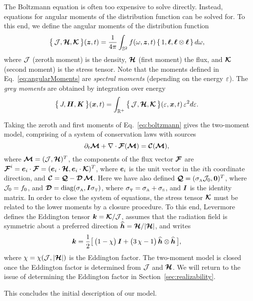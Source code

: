 The Boltzmann equation is often too expensive to solve directly.  
Instead, equations for angular moments of the distribution function can be solved for.  
To this end, we define the angular moments of the distribution function
\begin{equation}
  \big\{\,\mathcal{J},\boldsymbol{\mathcal{H}},\boldsymbol{\mathcal{K}}\,\big\}(\boldsymbol{z},t)
  =\frac{1}{4\pi}\int_{\mathbb{S}^{2}}f(\omega,\boldsymbol{z},t)\,\{\,1,\boldsymbol{\ell},\boldsymbol{\ell}\otimes\boldsymbol{\ell}\,\}\,d\omega,
  \label{eq:angularMoments}
\end{equation}
where $\mathcal{J}$ (zeroth moment) is the density, $\boldsymbol{\mathcal{H}}$ (first moment) the flux, and $\boldsymbol{\mathcal{K}}$ (second moment) is the stress tensor.  
Note that the moments defined in Eq.~\ref{eq:angularMoments} are \emph{spectral moments} (depending on the energy $\varepsilon$).  
The \emph{grey moments} are obtained by integration over energy
\begin{equation}
  \big\{\,J,\boldsymbol{H},\boldsymbol{K}\,\big\}(\boldsymbol{x},t)
  =\int_{\mathbb{R}^{+}}\big\{\,\mathcal{J},\boldsymbol{\mathcal{H}},\boldsymbol{\mathcal{K}}\,\big\}(\varepsilon,\boldsymbol{x},t)\,\varepsilon^{2}d\varepsilon.  
\end{equation}

Taking the zeroth and first moments of Eq.~\eqref{eq:boltzmann} gives the two-moment model, comprising of a system of conservation laws with sources
\begin{equation}
  \partial_{t}{\boldsymbol{\mathcal{M}}}+\nabla\cdot\boldsymbol{\mathcal{F}}(\boldsymbol{\mathcal{M}})=\boldsymbol{\mathcal{C}}(\boldsymbol{\mathcal{M}}),
  \label{eq:momentEquations}
\end{equation}
where $\boldsymbol{\mathcal{M}}=(\mathcal{J},\boldsymbol{\mathcal{H}})^{T}$, the components of the flux vector $\boldsymbol{\mathcal{F}}$ are $\boldsymbol{\mathcal{F}}^{i}=\boldsymbol{e}_{i}\cdot\boldsymbol{\mathcal{F}}=(\boldsymbol{e}_{i}\cdot\boldsymbol{\mathcal{H}},\boldsymbol{e}_{i}\cdot\boldsymbol{\mathcal{K}})^{T}$, where $\boldsymbol{e}_{i}$ is the unit vector in the $i$th coordinate direction, and $\boldsymbol{\mathcal{C}}=\boldsymbol{\mathcal{Q}}-\boldsymbol{\mathcal{D}}\,\boldsymbol{\mathcal{M}}$.  
Here we have also defined $\boldsymbol{\mathcal{Q}}=(\sigma_{\mbox{\tiny A}}\mathcal{J}_{0},\boldsymbol{0})^{T}$, where $\mathcal{J}_{0}=f_{0}$, and $\boldsymbol{\mathcal{D}}=\mbox{diag}(\sigma_{\mbox{\tiny A}},\boldsymbol{I}\sigma_{\mbox{\tiny T}})$, where $\sigma_{\mbox{\tiny T}}=\sigma_{\mbox{\tiny A}}+\sigma_{\mbox{\tiny S}}$, and $\boldsymbol{I}$ is the identity matrix.  
In order to close the system of equations, the stress tensor $\boldsymbol{\mathcal{K}}$ must be related to the lower moments by a closure procedure.  
To this end, Levermore \cite{levermore_1984} defines the Eddington tensor $\boldsymbol{k}=\boldsymbol{\mathcal{K}}/\mathcal{J}$, assumes that the radiation field is symmetric about a preferred direction $\widehat{\boldsymbol{h}}=\boldsymbol{\mathcal{H}}/|\boldsymbol{\mathcal{H}}|$, and writes
\begin{equation}
  \boldsymbol{k}=\frac{1}{2}\big[\,\big(1-\chi\big)\,\boldsymbol{I}+\big(3\,\chi-1\big)\,\widehat{\boldsymbol{h}}\otimes\widehat{\boldsymbol{h}}\,\big],
\end{equation}
where $\chi=\chi(\mathcal{J},|\boldsymbol{\mathcal{H}}|)$ is the Eddington factor.  
The two-moment model is closed once the Eddington factor is determined from $\mathcal{J}$ and $\boldsymbol{\mathcal{H}}$.  
We will return to the issue of determining the Eddington factor in Section~\ref{sec:realizability}.  

This concludes the initial description of our model.  